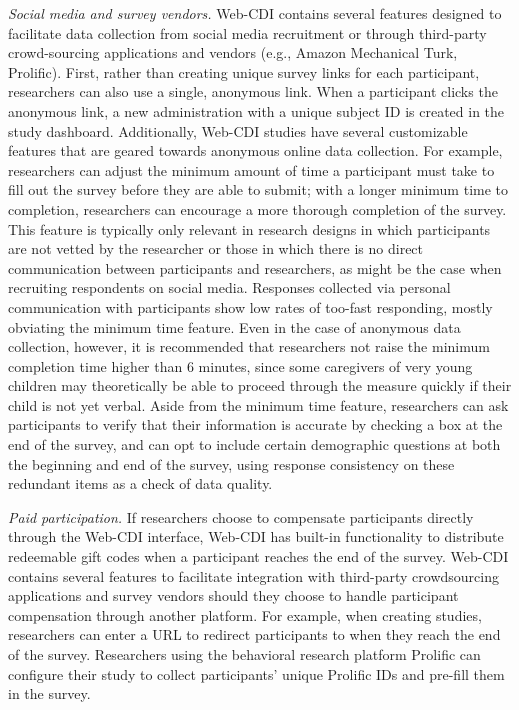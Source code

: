 \documentclass[
  english,
  ,man,floatsintext]{apa6}
\begin{document}
\emph{Social media and survey vendors.} Web-CDI contains several features designed to facilitate data collection from social media recruitment or through third-party crowd-sourcing applications and vendors (e.g., Amazon Mechanical Turk, Prolific). First, rather than creating unique survey links for each participant, researchers can also use a single, anonymous link. When a participant clicks the anonymous link, a new administration with a unique subject ID is created in the study dashboard. Additionally, Web-CDI studies have several customizable features that are geared towards anonymous online data collection. For example, researchers can adjust the minimum amount of time a participant must take to fill out the survey before they are able to submit; with a longer minimum time to completion, researchers can encourage a more thorough completion of the survey. This feature is typically only relevant in research designs in which participants are not vetted by the researcher or those in which there is no direct communication between participants and researchers, as might be the case when recruiting respondents on social media. Responses collected via personal communication with participants show low rates of too-fast responding, mostly obviating the minimum time feature. Even in the case of anonymous data collection, however, it is recommended that researchers not raise the minimum completion time higher than 6 minutes, since some caregivers of very young children may theoretically be able to proceed through the measure quickly if their child is not yet verbal. Aside from the minimum time feature, researchers can ask participants to verify that their information is accurate by checking a box at the end of the survey, and can opt to include certain demographic questions at both the beginning and end of the survey, using response consistency on these redundant items as a check of data quality.

\emph{Paid participation.} If researchers choose to compensate participants directly through the Web-CDI interface, Web-CDI has built-in functionality to distribute redeemable gift codes when a participant reaches the end of the survey. Web-CDI contains several features to facilitate integration with third-party crowdsourcing applications and survey vendors should they choose to handle participant compensation through another platform. For example, when creating studies, researchers can enter a URL to redirect participants to when they reach the end of the survey. Researchers using the behavioral research platform Prolific can configure their study to collect participants' unique Prolific IDs and pre-fill them in the survey.
\end{document}
